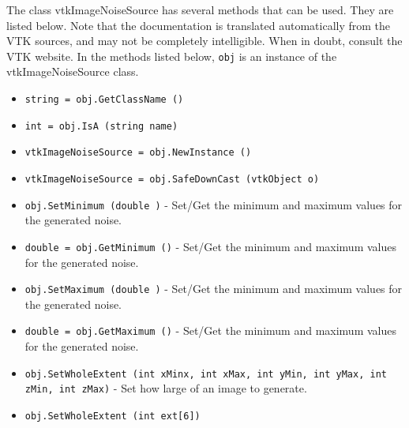 The class vtkImageNoiseSource has several methods that can be used.
  They are listed below.
Note that the documentation is translated automatically from the VTK sources,
and may not be completely intelligible.  When in doubt, consult the VTK website.
In the methods listed below, \verb|obj| is an instance of the vtkImageNoiseSource class.
\begin{itemize}
\item  \verb|string = obj.GetClassName ()|

\item  \verb|int = obj.IsA (string name)|

\item  \verb|vtkImageNoiseSource = obj.NewInstance ()|

\item  \verb|vtkImageNoiseSource = obj.SafeDownCast (vtkObject o)|

\item  \verb|obj.SetMinimum (double )| -  Set/Get the minimum and maximum values for the generated noise.

\item  \verb|double = obj.GetMinimum ()| -  Set/Get the minimum and maximum values for the generated noise.

\item  \verb|obj.SetMaximum (double )| -  Set/Get the minimum and maximum values for the generated noise.

\item  \verb|double = obj.GetMaximum ()| -  Set/Get the minimum and maximum values for the generated noise.

\item  \verb|obj.SetWholeExtent (int xMinx, int xMax, int yMin, int yMax, int zMin, int zMax)| -  Set how large of an image to generate.

\item  \verb|obj.SetWholeExtent (int ext[6])|

\end{itemize}
